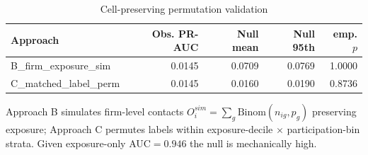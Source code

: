 \begin{table}[htbp]\centering
\caption{Cell-preserving permutation validation}
\label{tab:opp_permutation}
\begin{tabular}{lrrrr}\hline
Approach & Obs. PR-AUC & Null mean & Null 95th & emp. $p$ \\\hline
B\_firm\_exposure\_sim & 0.0145 & 0.0709 & 0.0769 & 1.0000 \\
C\_matched\_label\_perm & 0.0145 & 0.0160 & 0.0190 & 0.8736 \\
\hline\end{tabular}
\begin{tablenotes}\footnotesize\item Approach B simulates firm-level contacts $O_i^{sim}=\sum_g \text{Binom}(n_{ig},p_g)$ preserving exposure; Approach C permutes labels within exposure-decile $\times$ participation-bin strata. Given exposure-only AUC$=0.946$ the null is mechanically high.\end{tablenotes}
\end{table}
